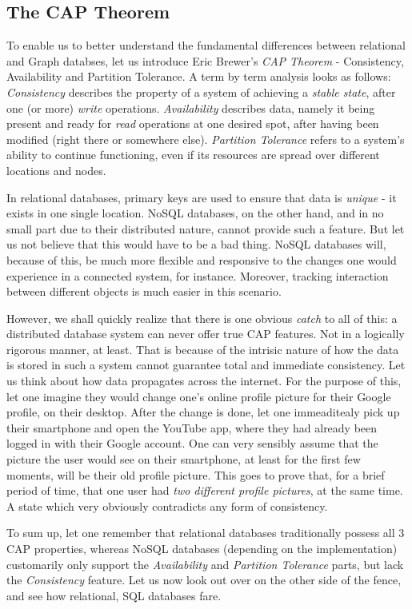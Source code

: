 \documentclass[10pt,        %
               a4paper,     %
               journal,     %
               ]{IEEEtran}
\begin{document}
\subsection{The CAP Theorem}
To enable us to better understand the fundamental differences between relational and Graph databses, let us introduce Eric Brewer's \textit{CAP Theorem} - Consistency, Availability and Partition Tolerance. \cite{brewer_cap_theorem} A term by term analysis looks as follows: \textit{Consistency} describes the property of a system of achieving a \textit{stable state}, after one (or more) \textit{write} operations. \textit{Availability} describes data, namely it being present and ready for \textit{read} operations at one desired spot, after having been modified (right there or somewhere else). \textit{Partition Tolerance} refers to a system's ability to continue functioning, even if its resources are spread over different locations and nodes. \par
In relational databases, primary keys are used to ensure that data is \textit{unique} - it exists in one single location. NoSQL databases, on the other hand, and in no small part due to their distributed nature, cannot provide such a feature. But let us not believe that this would have to be a bad thing. NoSQL databases will, because of this, be much more flexible and responsive to the changes one would experience in a connected system, for instance. Moreover, tracking interaction between different objects is much easier in this scenario. \par
However, we shall quickly realize that there is one obvious \textit{catch} to all of this: a distributed database system can never offer true CAP features. Not in a logically rigorous manner, at least. That is because of the intrisic nature of how the data is stored in such a system cannot guarantee total and immediate consistency. Let us think about how data propagates across the internet. For the purpose of this, let one imagine they would change one's online profile picture for their Google profile, on their desktop. After the change is done, let one immeaditealy pick up their smartphone and open the YouTube app, where they had already been logged in with their Google account. One can very sensibly assume that the picture the user would see on their smartphone, at least for the first few moments, will be their old profile picture. This goes to prove that, for a brief period of time, that one user had \textit{two different profile pictures}, at the same time. A state which very obviously contradicts any form of consistency. \par
To sum up, let one remember that relational databases traditionally possess all 3 CAP properties, whereas NoSQL databases (depending on the implementation) customarily only support the \textit{Availability} and \textit{Partition Tolerance} parts, but lack the \textit{Consistency} feature. Let us now look out over on the other side of the fence, and see how relational, SQL databases fare. \par
\end{document}
